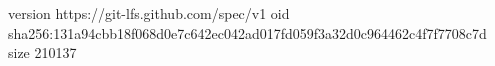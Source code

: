 version https://git-lfs.github.com/spec/v1
oid sha256:131a94cbb18f068d0e7c642ec042ad017fd059f3a32d0c964462c4f7f7708c7d
size 210137
